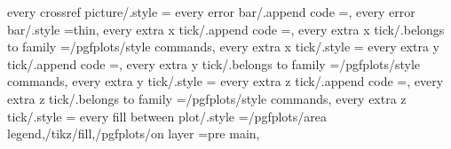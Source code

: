{{{{every crossref picture/.style                                      ={%
every error bar/.append code                                       ={},                                                                            
every error bar/.style                                             ={thin},                                                                                                                            
every extra x tick/.append code                                    ={},                                                                         
every extra x tick/.belongs to family                              =/pgfplots/style commands,                                                                                                          
every extra x tick/.style                                          ={                                                                                                                                  
every extra y tick/.append code                                    ={},                                                                         
every extra y tick/.belongs to family                              =/pgfplots/style commands,                                                                                                          
every extra y tick/.style                                          ={                                                                                                                                  
every extra z tick/.append code                                    ={},                                                                         
every extra z tick/.belongs to family                              =/pgfplots/style commands,                                                                                                          
every extra z tick/.style                                          ={                                                                                                                                  
every fill between plot/.style                                     ={/pgfplots/area legend,/tikz/fill,/pgfplots/on layer                                                                               =pre main},                                                
}}}}}}}}
